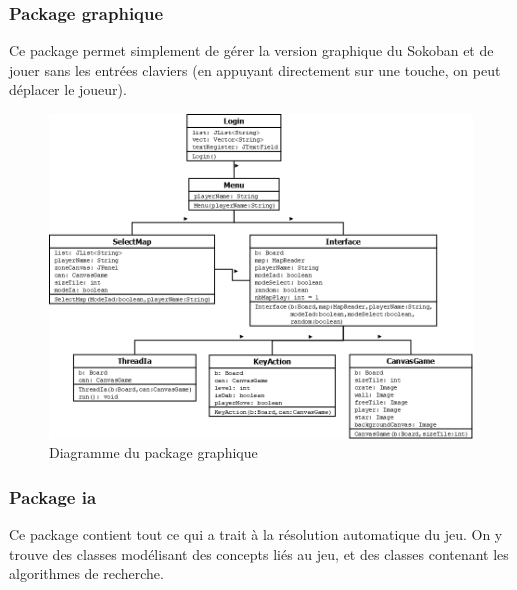 \documentclass[a4paper,12pt]{article} %
\begin{document}
\subsubsection{Package graphique}

Ce package permet simplement de gérer la version graphique du Sokoban et de jouer sans les entrées claviers (en appuyant directement sur une touche, on peut déplacer le joueur).

\begin{figure}[!h]
\centering
\includegraphics[scale=0.4]{images/graphique.png}
\caption{Diagramme du package graphique}
\end{figure}

\subsubsection{Package ia}

Ce package contient tout ce qui a trait à la résolution automatique du jeu. On y trouve des classes modélisant des concepts liés au jeu, et des classes contenant les algorithmes de recherche.
\end{document}
